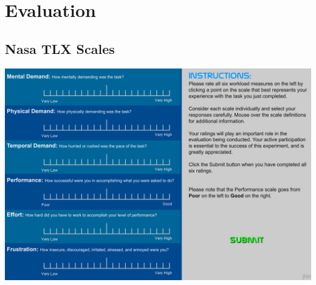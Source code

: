 \chapter{Evaluation}

\section{Nasa TLX Scales}

\includegraphics[width=\textwidth]{Figures/appendix_nasatlx.png}



